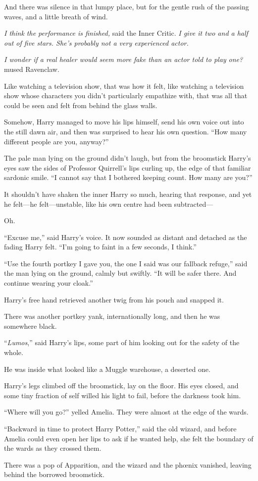 And there was silence in that lumpy place, but for the gentle rush of the passing waves, and a little breath of wind.

\emph{I think the performance is finished,} said the Inner Critic. \emph{I give it two and a half out of five stars. She’s probably not a very experienced actor.}

\emph{I wonder if a real healer would seem more fake than an actor told to play one?} mused Ravenclaw.

Like watching a television show, that was how it felt, like watching a television show whose characters you didn’t particularly empathize with, that was all that could be seen and felt from behind the glass walls.

Somehow, Harry managed to move his lips himself, send his own voice out into the still dawn air, and then was surprised to hear his own question. “How many different people are you, anyway?”

The pale man lying on the ground didn’t laugh, but from the broomstick Harry’s eyes saw the sides of Professor Quirrell’s lips curling up, the edge of that familiar sardonic smile. “I cannot say that I bothered keeping count. How many are you?”

It shouldn’t have shaken the inner Harry so much, hearing that response, and yet he felt—he felt—unstable, like his own centre had been subtracted—

Oh.

“Excuse me,” said Harry’s voice. It now sounded as distant and detached as the fading Harry felt. “I’m going to faint in a few seconds, I think.”

“Use the fourth portkey I gave you, the one I said was our fallback refuge,” said the man lying on the ground, calmly but swiftly. “It will be safer there. And continue wearing your cloak.”

Harry’s free hand retrieved another twig from his pouch and snapped it.

There was another portkey yank, internationally long, and then he was somewhere black.

“\emph{Lumos},” said Harry’s lips, some part of him looking out for the safety of the whole.

He was inside what looked like a Muggle warehouse, a deserted one.

Harry’s legs climbed off the broomstick, lay on the floor. His eyes closed, and some tiny fraction of self willed his light to fail, before the darkness took him.

\later

“Where will you go?” yelled Amelia. They were almost at the edge of the wards.

“Backward in time to protect Harry Potter,” said the old wizard, and before Amelia could even open her lips to ask if he wanted help, she felt the boundary of the wards as they crossed them.

There was a pop of Apparition, and the wizard and the phœnix vanished, leaving behind the borrowed broomstick.

